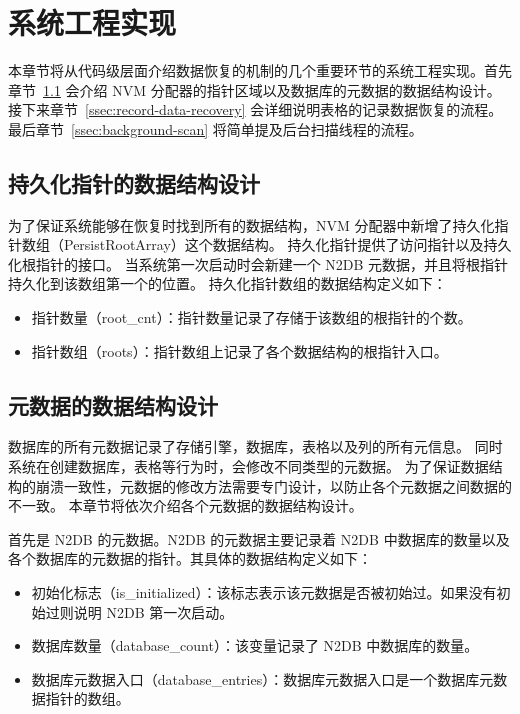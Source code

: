\section{系统工程实现}
本章节将从代码级层面介绍数据恢复的机制的几个重要环节的系统工程实现。首先章节~\ref{ssec:data-structure-recovery} 会介绍 NVM 分配器的指针区域以及数据库的元数据的数据结构设计。
接下来章节~\ref{ssec:record-data-recovery} 会详细说明表格的记录数据恢复的流程。
最后章节~\ref{ssec:background-scan} 将简单提及后台扫描线程的流程。

\subsection{持久化指针的数据结构设计}
\label{ssec:data-structure-recovery}

为了保证系统能够在恢复时找到所有的数据结构，NVM 分配器中新增了持久化指针数组（PersistRootArray）这个数据结构。
持久化指针提供了访问指针以及持久化根指针的接口。
当系统第一次启动时会新建一个 N2DB 元数据，并且将根指针持久化到该数组第一个的位置。
持久化指针数组的数据结构定义如下：
\begin{itemize}
    \item 指针数量（root\_cnt）：指针数量记录了存储于该数组的根指针的个数。
    \item 指针数组（roots）：指针数组上记录了各个数据结构的根指针入口。
\end{itemize}



\subsection{元数据的数据结构设计}

数据库的所有元数据记录了存储引擎，数据库，表格以及列的所有元信息。
同时系统在创建数据库，表格等行为时，会修改不同类型的元数据。
为了保证数据结构的崩溃一致性，元数据的修改方法需要专门设计，以防止各个元数据之间数据的不一致。
本章节将依次介绍各个元数据的数据结构设计。

首先是 N2DB 的元数据。N2DB 的元数据主要记录着 N2DB 中数据库的数量以及各个数据库的元数据的指针。其具体的数据结构定义如下：
\begin{itemize}
    \item 初始化标志（is\_initialized）：该标志表示该元数据是否被初始过。如果没有初始过则说明 N2DB 第一次启动。
    \item 数据库数量（database\_count）：该变量记录了 N2DB 中数据库的数量。
    \item 数据库元数据入口（database\_entries）：数据库元数据入口是一个数据库元数据指针的数组。
\end{itemize}

